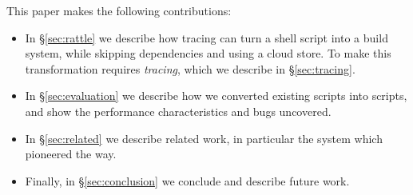 This paper makes the following contributions:

\begin{itemize}
\item In \S\ref{sec:rattle} we describe how tracing can turn a shell script into a build system, while skipping dependencies and using a cloud store. To make this transformation requires \emph{tracing}, which we describe in \S\ref{sec:tracing}. %
\item In \S\ref{sec:evaluation} we describe how we converted existing \Make scripts into \Rattle scripts, and show the performance characteristics and bugs uncovered.
\item In \S\ref{sec:related} we describe related work, in particular the \Fabricate system which pioneered the way.
\item Finally, in \S\ref{sec:conclusion} we conclude and describe future work.
\end{itemize}
